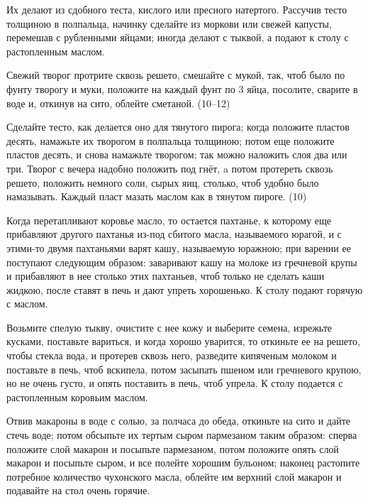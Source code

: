 Их делают из сдобного теста, кислого или пресного натертого. Рассучив тесто толщиною в полпальца, начинку сделайте из моркови или свежей капусты, перемешав с рубленными яйцами; иногда делают с тыквой, а подают к столу с растопленным маслом. 


Свежий творог протрите сквозь решето, смешайте с мукой, так, чтоб было по фунту творогу и муки, положите на каждый фунт по 3 яйца, посолите, сварите в воде и, откинув на сито, облейте сметаной. (10--12) 


Сделайте тесто, как делается оно для тянутого пирога; когда положите пластов десять, намажьте их творогом в полпальца толщиною; потом еще положите пластов десять, и снова намажьте творогом; так можно наложить слоя два или три. Творог с вечера надобно положить под гнёт, a потом протереть сквозь решето, положить немного соли, сырых яиц, столько, чтоб удобно было намазывать. Каждый пласт мазать маслом как в тянутом пироге. (10) 


Когда перетапливают коровье масло, то остается пахтанье, к которому еще прибавляют другого пахтанья из-под сбитого масла, называемого юрагой, и с этими-то двумя пахтаньями варят кашу, называемую юражною; при варении ее поступают следующим образом: заваривают кашу на молоке из гречневой крупы и прибавляют в нее столько этих пахтаньев, чтоб только не сделать каши жидкою, после ставят в печь и дают упреть хорошенько. К столу подают горячую с маслом. 


Возьмите спелую тыкву, очистите с нее кожу и выберите семена, изрежьте кусками, поставьте вариться, и когда хорошо уварится, то откиньте ее на решето, чтобы стекла вода, и протерев сквозь него, разведите кипяченым молоком и поставьте в печь, чтоб вскипела, потом засыпать пшеном или гречневого крупою, но не очень густо, и опять поставить в печь, чтоб упрела. К столу подается с растопленным коровьим маслом. 


Отвив макароны в воде с солью, за полчаса до обеда, откиньте на сито и дайте стечь воде; потом обсыпьте их тертым сыром пармезаном таким образом: сперва положите слой макарон и посыпьте пармезаном, потом положите опять слой макарон и посыпьте сыром, и все полейте хорошим бульоном; наконец растопите потребное количество чухонского масла, облейте им верхний слой макарон и подавайте на стол очень горячие. 

